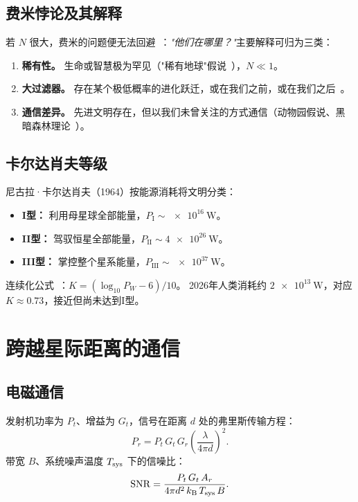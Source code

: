 \documentclass[12pt,a4paper]{article}
\newcommand{\kB}{k_{\mathrm{B}}}
\begin{document}
\subsection{费米悖论及其解释}

若 $N$ 很大，费米的问题便无法回避~\citep{Hart1975}：\textit{"他们在哪里？"}主要解释可归为三类：
\begin{enumerate}[noitemsep]
  \item \textbf{稀有性。} 生命或智慧极为罕见（"稀有地球"假说~\citep{WardBrownlee2000}），$N \ll 1$。
  \item \textbf{大过滤器。} 存在某个极低概率的进化跃迁，或在我们之前，或在我们之后~\citep{Hanson1998}。
  \item \textbf{通信差异。} 先进文明存在，但以我们未曾关注的方式通信（动物园假说、黑暗森林理论~\citep{Liu2008}）。
\end{enumerate}

\subsection{卡尔达肖夫等级}
\label{sec:kardashev_zh}

尼古拉·卡尔达肖夫（1964）按能源消耗将文明分类：
\begin{itemize}[noitemsep]
  \item \textbf{I型：} 利用母星球全部能量，$P_{\mathrm{I}} \sim \SI{e16}{\watt}$。
  \item \textbf{II型：} 驾驭恒星全部能量，$P_{\mathrm{II}} \sim \SI{4e26}{\watt}$。
  \item \textbf{III型：} 掌控整个星系能量，$P_{\mathrm{III}} \sim \SI{e37}{\watt}$。
\end{itemize}
连续化公式~\citep{Sagan1973}：$K = (\log_{10} P_W - 6)/10$。
2026年人类消耗约 $\SI{2e13}{\watt}$，对应 $K \approx 0.73$，接近但尚未达到I型。

\section{跨越星际距离的通信}

\subsection{电磁通信}

发射机功率为 $P_t$、增益为 $G_t$，信号在距离 $d$ 处的弗里斯传输方程：
\begin{equation}
  P_r = P_t\,G_t\,G_r\!\left(\frac{\lambda}{4\pi d}\right)^2.
\end{equation}
带宽 $B$、系统噪声温度 $T_{\rm sys}$ 下的信噪比：
\begin{equation}
  \mathrm{SNR} = \frac{P_t\,G_t\,A_r}{4\pi d^2\,\kB\,T_{\rm sys}\,B}.
\end{equation}
\end{document}
